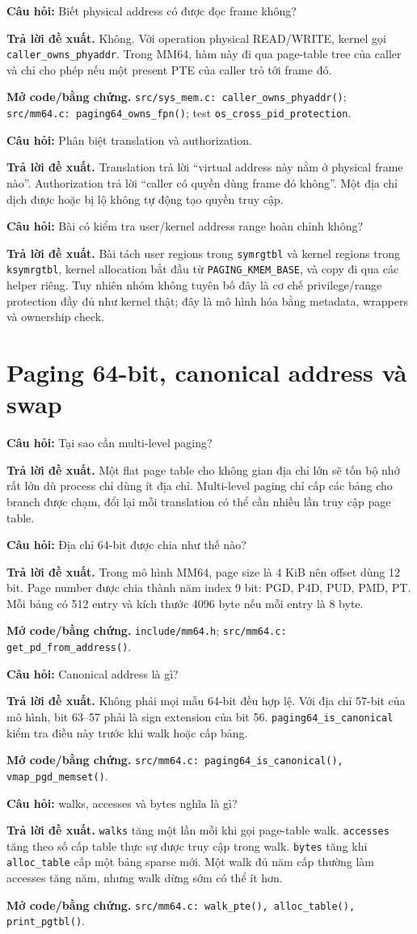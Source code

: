 \documentclass[11pt,a4paper]{article}
\newcommand{\code}[1]{\texttt{\color{navy}#1}}
\newcommand{\q}[1]{%
  \vspace{0.55em}\noindent
  \colorbox{pale}{\parbox{\dimexpr\textwidth-2\fboxsep}{\textbf{\color{navy}Câu hỏi:} #1}}%
  \par\vspace{0.3em}}
\newcommand{\ans}[1]{\textbf{\color{cyan}Trả lời đề xuất.} #1\par}
\newcommand{\proofcode}[1]{\textbf{\color{orange}Mở code/bằng chứng.} #1\par}
\begin{document}
\q{Biết physical address có được đọc frame không?}
\ans{Không. Với operation physical READ/WRITE, kernel gọi
\code{caller\_owns\_phyaddr}. Trong MM64, hàm này đi qua page-table tree của
caller và chỉ cho phép nếu một present PTE của caller trỏ tới frame đó.}
\proofcode{\code{src/sys\_mem.c: caller\_owns\_phyaddr()};
\code{src/mm64.c: paging64\_owns\_fpn()}; test
\code{os\_cross\_pid\_protection}.}

\q{Phân biệt translation và authorization.}
\ans{Translation trả lời ``virtual address này nằm ở physical frame nào''.
Authorization trả lời ``caller có quyền dùng frame đó không''. Một địa chỉ dịch
được hoặc bị lộ không tự động tạo quyền truy cập.}

\q{Bài có kiểm tra user/kernel address range hoàn chỉnh không?}
\ans{Bài tách user regions trong \code{symrgtbl} và kernel regions trong
\code{ksymrgtbl}, kernel allocation bắt đầu từ \code{PAGING\_KMEM\_BASE}, và
copy đi qua các helper riêng. Tuy nhiên nhóm không tuyên bố đây là cơ chế
privilege/range protection đầy đủ như kernel thật; đây là mô hình hóa bằng
metadata, wrappers và ownership check.}

\section{Paging 64-bit, canonical address và swap}

\q{Tại sao cần multi-level paging?}
\ans{Một flat page table cho không gian địa chỉ lớn sẽ tốn bộ nhớ rất lớn dù
process chỉ dùng ít địa chỉ. Multi-level paging chỉ cấp các bảng cho branch
được chạm, đổi lại mỗi translation có thể cần nhiều lần truy cập page table.}

\q{Địa chỉ 64-bit được chia như thế nào?}
\ans{Trong mô hình MM64, page size là 4 KiB nên offset dùng 12 bit. Page number
được chia thành năm index 9 bit: PGD, P4D, PUD, PMD, PT. Mỗi bảng có 512 entry
và kích thước 4096 byte nếu mỗi entry là 8 byte.}
\proofcode{\code{include/mm64.h}; \code{src/mm64.c: get\_pd\_from\_address()}.}

\q{Canonical address là gì?}
\ans{Không phải mọi mẫu 64-bit đều hợp lệ. Với địa chỉ 57-bit của mô hình,
bit 63--57 phải là sign extension của bit 56. \code{paging64\_is\_canonical}
kiểm tra điều này trước khi walk hoặc cấp bảng.}
\proofcode{\code{src/mm64.c: paging64\_is\_canonical(),
vmap\_pgd\_memset()}.}

\q{walks, accesses và bytes nghĩa là gì?}
\ans{\code{walks} tăng một lần mỗi khi gọi page-table walk.
\code{accesses} tăng theo số cấp table thực sự được truy cập trong walk.
\code{bytes} tăng khi \code{alloc\_table} cấp một bảng sparse mới. Một walk đủ
năm cấp thường làm accesses tăng năm, nhưng walk dừng sớm có thể ít hơn.}
\proofcode{\code{src/mm64.c: walk\_pte(), alloc\_table(), print\_pgtbl()}.}
\end{document}
